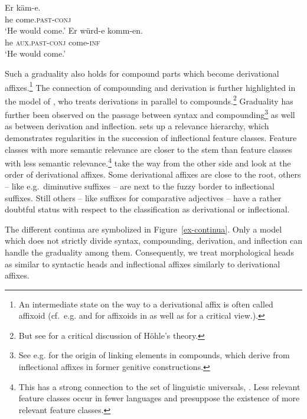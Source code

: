 \documentclass[output=paper
  ,nobabel
  ,draftmode
  ,colorlinks, citecolor=brown
]{langscibook}
\begin{document}
\largerpage
\eal\label{conj}
\ex
\gll Er    käm-e. \\ 
     he   come.\textsc{past-conj}  \\
\glt  `He would come.'
\ex
\gll Er    würd-e   komm-en.\\ 
     he   \textsc{aux.past-conj} come-\textsc{inf}  \\
\glt `He would come.'
\zl

\noindent Such a graduality also holds for compound parts which become derivational affixes.\footnote{An intermediate state on the way to a derivational affix is often called affixoid (cf.\ e.g. \cite{Elsen2009} and \cite{Szatmari2011} for affixoids in  as well as \cite{Schmidt1987} for a critical view.).} The connection of compounding and derivation is further highlighted in the model of \citet{Hoehle1982}, who treats derivations in parallel to compounds.\footnote{But see \citet{Reis1983} for a critical discussion of Höhle's theory.} Graduality has further been observed on the passage between syntax and compounding\footnote{See e.g. \citet[Section~2]{NueblingSzczepaniak2009} for the origin of linking elements in  compounds, which derive from inflectional affixes in former genitive constructions.} as well as between derivation and inflection. \citet{Bybee1985} sets up a relevance hierarchy, which demonstrates regularities in the succession of inflectional feature classes. Feature classes with more semantic relevance are closer to the stem than feature classes with less semantic relevance.\footnote{This has a strong connection to the set of linguistic universals, \citep[cf.][]{Greenberg1963}. Less relevant feature classes occur in fewer languages and presuppose the existence of more relevant feature classes.} \citet{EisenbergSayatz2002} take the way from the other side and look at the order of derivational affixes. Some derivational affixes are close to the root, others – like e.g.\ diminutive suffixes \citep[cf.][]{Dressler1994} – are next to the fuzzy border to inflectional suffixes. Still others – like suffixes for comparative adjectives – have a rather doubtful status with respect to the classification as derivational or inflectional.

The different continua are symbolized in Figure~\ref{ex-continua}. Only a model which does not strictly divide syntax, compounding, derivation, and inflection can handle the graduality among them. Consequently, we treat morphological heads as similar to syntactic heads and inflectional affixes similarly to derivational affixes.
\end{document}
